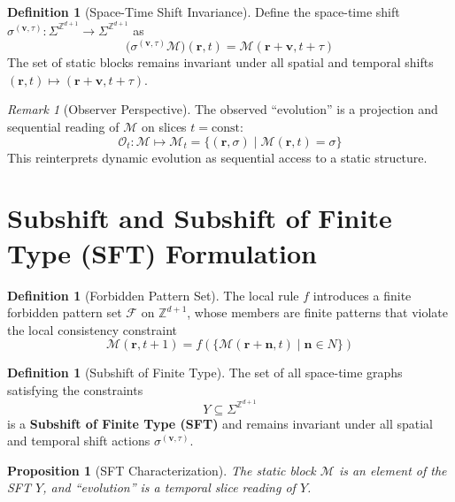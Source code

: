 \documentclass[11pt]{article}
\newtheorem{proposition}[theorem]{Proposition}
\theoremstyle{definition}
\newtheorem{definition}[theorem]{Definition}
\theoremstyle{remark}
\newtheorem{remark}[theorem]{Remark}
\begin{document}
\begin{definition}[Space-Time Shift Invariance]\label{def:stshift}
Define the space-time shift \( \sigma^{(\mathbf{v},\tau)}: \Sigma^{\mathbb{Z}^{d+1}} \to \Sigma^{\mathbb{Z}^{d+1}} \) as
\[
\big(\sigma^{(\mathbf{v},\tau)}\mathcal{M}\big)(\mathbf{r},t) = \mathcal{M}(\mathbf{r}+\mathbf{v}, t+\tau)
\]
The set of static blocks remains invariant under all spatial and temporal shifts \( (\mathbf{r},t) \mapsto (\mathbf{r} + \mathbf{v}, t + \tau) \).
\end{definition}

\begin{remark}[Observer Perspective]
The observed ``evolution'' is a projection and sequential reading of \( \mathcal{M} \) on slices \( t = \mathrm{const} \):
\[
\mathcal{O}_t: \mathcal{M} \mapsto \mathcal{M}_t = \{ (\mathbf{r}, \sigma) \mid \mathcal{M}(\mathbf{r}, t) = \sigma \}
\]
This reinterprets dynamic evolution as sequential access to a static structure.
\end{remark}

\section{Subshift and Subshift of Finite Type (SFT) Formulation}\label{sec:subshift}

\begin{definition}[Forbidden Pattern Set]\label{def:forbidden}
The local rule \( f \) introduces a finite forbidden pattern set \( \mathcal{F} \) on \( \mathbb{Z}^{d+1} \), whose members are finite patterns that violate the local consistency constraint
\[
\mathcal{M}(\mathbf{r}, t+1) = f\left( \{ \mathcal{M}(\mathbf{r} + \mathbf{n}, t) \mid \mathbf{n} \in N \} \right)
\]
\end{definition}

\begin{definition}[Subshift of Finite Type]\label{def:sft}
The set of all space-time graphs satisfying the constraints
\[
Y \subseteq \Sigma^{\mathbb{Z}^{d+1}}
\]
is a \textbf{Subshift of Finite Type (SFT)} and remains invariant under all spatial and temporal shift actions \( \sigma^{(\mathbf{v},\tau)} \).
\end{definition}

\begin{proposition}[SFT Characterization]\label{prop:sft}
The static block \( \mathcal{M} \) is an element of the SFT \( Y \), and ``evolution'' is a temporal slice reading of \( Y \).
\end{proposition}
\end{document}
